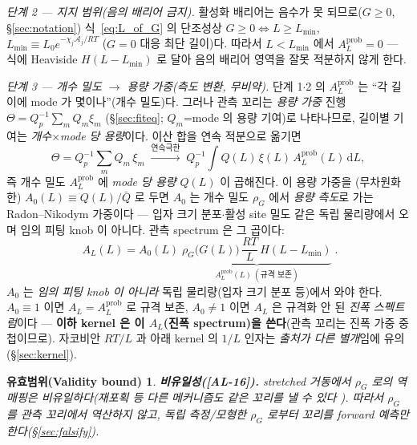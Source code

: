 \documentclass[11pt,a4paper]{article}
\newtheorem*{boundbox}{유효범위(Validity bound)}
\newcommand{\dd}{\mathrm{d}}
\newcommand{\AL}[1]{\textsf{[AL-#1]}}
\begin{document}
\emph{단계 2 — 지지 범위(음의 배리어 금지).} 활성화 배리어는 음수가 못 되므로($G\ge0$, \S\ref{sec:notation})
식~\eqref{eq:L_of_G} 의 단조성상 $G\ge0\Leftrightarrow L\ge L_{\min}$, $L_{\min}\equiv L_0 e^{-\chi_j\mathcal A_j/RT}$
($G=0$ 대응 최단 길이)다. 따라서 $L<L_{\min}$ 에서 $A_L^{\mathrm{prob}}=0$ — 식에 Heaviside $H(L-L_{\min})$ 로
달아 음의 배리어 영역을 잘못 적분하지 않게 한다.

\emph{단계 3 — 개수 밀도 $\to$ 용량 가중(측도 변환, 무비약).} 단계 1$\cdot$2 의 $A_L^{\mathrm{prob}}$ 는 ``각 길이에
mode 가 몇이나''(개수 밀도)다. 그러나 관측 꼬리는 \emph{용량 가중} 진행 $\Theta=Q_p^{-1}\sum_m Q_m\xi_m$
(\S\ref{sec:fiteq}; $Q_m$=mode 의 용량 기여)로 나타나므로, 길이별 기여는 \emph{개수}$\times$\emph{mode 당 용량}이다.
이산 합을 연속 적분으로 옮기면
\begin{equation*}
\Theta=Q_p^{-1}\sum_m Q_m\,\xi_m\;\xrightarrow{\text{연속극한}}\;Q_p^{-1}\!\int Q(L)\,\xi(L)\,A_L^{\mathrm{prob}}(L)\,\dd L,
\end{equation*}
즉 개수 밀도 $A_L^{\mathrm{prob}}$ 에 \emph{mode 당 용량} $Q(L)$ 이 곱해진다. 이 용량 가중을 (무차원화한)
$A_0(L)\equiv Q(L)/\bar Q$ 로 두면 $A_0$ 는 개수 밀도 $\rho_G$ 에서 \emph{용량 측도}로 가는 Radon--Nikodym
가중이다 — 입자 크기 분포$\cdot$활성 site 밀도 같은 독립 물리량에서 오며 임의 피팅 knob 이 아니다. 관측 spectrum 은
그 곱이다:
\begin{equation}
\boxed{\;A_L(L)=A_0(L)\;\underbrace{\rho_G\big(G(L)\big)\,\frac{RT}{L}\,H(L-L_{\min})}_{\displaystyle A_L^{\mathrm{prob}}(L)\ (\text{규격 보존})}\;.}
\label{eq:spectrum}
\end{equation}
$A_0$ 는 \emph{임의 피팅 knob 이 아니라} 독립 물리량(입자 크기 분포 등)에서 와야 한다. $A_0\equiv1$ 이면
$A_L=A_L^{\mathrm{prob}}$ 로 규격 보존, $A_0\ne1$ 이면 $A_L$ 은 규격화 안 된 \emph{진폭 스펙트럼}이다 — \textbf{이하
kernel 은 이 $A_L$(진폭 spectrum)을 쓴다}(관측 꼬리는 진폭 가중 중첩이므로). 자코비안 $RT/L$ 과 아래 kernel 의
$1/L$ 인자는 \emph{출처가 다른 별개}임에 유의(\S\ref{sec:kernel}).
\begin{boundbox}
\textbf{비유일성(\AL{16}).} stretched 거동에서 $\rho_G$ 로의 역매핑은 \emph{비유일}하다(재포획 등 다른
메커니즘도 같은 꼬리를 낼 수 있다 \cite{baessler1993}). 따라서 $\rho_G$ 를 관측 꼬리에서 \emph{역산하지
않고}, 독립 측정/모형한 $\rho_G$ 로부터 꼬리를 \emph{forward 예측}만 한다(\S\ref{sec:falsify}).
\end{boundbox}

\end{document}
